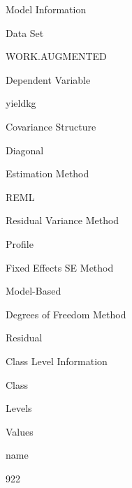 \documentclass[
]{book}
\begin{document}
Model Information

Data Set

WORK.AUGMENTED

Dependent Variable

yieldkg

Covariance Structure

Diagonal

Estimation Method

REML

Residual Variance Method

Profile

Fixed Effects SE Method

Model-Based

Degrees of Freedom Method

Residual

Class Level Information

Class

Levels

Values

name

922
\end{document}
